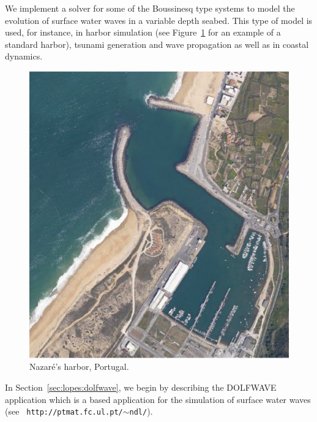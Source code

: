 We implement a solver  for some of the Boussinesq type
systems to model the evolution of surface water
waves in a variable depth seabed.  This
type of model is used, for instance, in harbor
simulation (see Figure~\ref{fig:lopes:harbor} for an
example of a standard harbor), tsunami generation and wave
propagation as well as in coastal dynamics.
\begin{figure}
  \begin{center}
    \includegraphics[width=\smallfig]{chapters/lopes/pdf/nazare1.pdf}
  \end{center}
  \caption{Nazar\'{e}'s harbor, Portugal.}\label{fig:lopes:harbor}
\end{figure}

In Section~\ref{sec:lopes:dolfwave}, we begin by describing the
DOLFWAVE application which is a \fenics based application for the
simulation of surface water waves (see {\tt
  http://ptmat.fc.ul.pt/$\sim$ndl/}).

